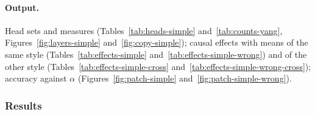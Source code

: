 \documentclass[11pt,a4paper]{article}
\begin{document}
\paragraph{Output.} Head sets and measures (Tables~\ref{tab:heads-simple} and~\ref{tab:counts-yang}, Figures~\ref{fig:layers-simple} and~\ref{fig:copy-simple}); causal effects with means of the same style (Tables~\ref{tab:effects-simple} and~\ref{tab:effects-simple-wrong}) and of the other style (Tables~\ref{tab:effects-simple-cross} and~\ref{tab:effects-simple-wrong-cross}); accuracy against $\alpha$ (Figures~\ref{fig:patch-simple} and~\ref{fig:patch-simple-wrong}).

\subsubsection{Results}\label{sec:res-e1}
\end{document}
